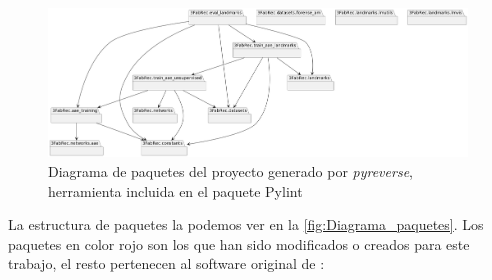 \begin{figure}[!h]
    \centering
    \includegraphics[width=0.99\textwidth]{img/diagrama_paquetes_1.png}
    \caption{Diagrama de paquetes del proyecto generado por \textit{pyreverse}, herramienta incluida en el paquete Pylint}
    \label{fig:Diagrama_paquetes}
\end{figure}

\medskip

\noindent La estructura de paquetes la podemos ver en la \autoref{fig:Diagrama_paquetes}. Los paquetes en color rojo son los que han sido modificados o creados para este trabajo, el resto pertenecen al software original de \cite{browatzki20203fabrec}:

